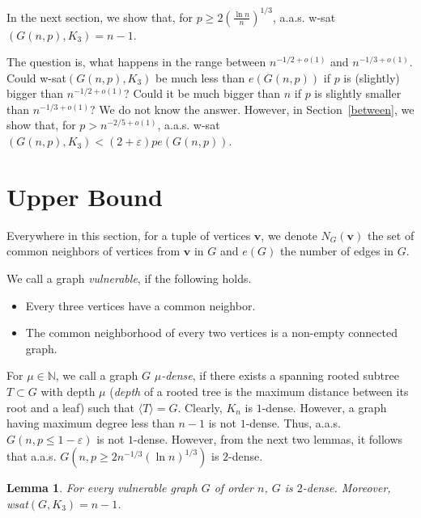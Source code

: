\documentclass[]{article}
\newtheorem{lemma}[theorem]{Lemma}
\begin{document}
In the next section, we show that, for $p\geq 2\left(\frac{\ln n}{n}\right)^{1/3}$, a.a.s. w-sat$(G(n,p),K_3)=n-1$. 

The question is, what happens in the range between $n^{-1/2+o(1)}$ and $n^{-1/3+o(1)}$. Could w-sat$(G(n,p),K_3)$ be much less than $e(G(n,p))$ if $p$ is (slightly) bigger than $n^{-1/2+o(1)}$? Could it be much bigger than $n$ if $p$ is slightly smaller than $n^{-1/3+o(1)}$? We do not know the answer. However, in Section~\ref{between}, we show that, for $p>n^{-2/5+o(1)}$, a.a.s. w-sat$(G(n,p),K_3)<(2+\varepsilon)p e(G(n,p))$.


 
 
 \section{Upper Bound}
 \label{upper}
 
 Everywhere in this section, for a tuple of vertices $\mathbf{v}$, we denote $N_G(\mathbf{v})$ the set of common neighbors of vertices from $\mathbf{v}$ in $G$ and $e(G)$ the number of edges in $G$.
 
 We call a graph {\it vulnerable}, if the following holds.
 
\begin{itemize}
	\item  Every three vertices have a common neighbor.
	\item The common neighborhood of every two vertices is a non-empty connected graph.
\end{itemize} 

For $\mu\in\mathbb{N}$, we call a graph $G$ {\it $\mu$-dense}, if there exists a spanning rooted subtree $T\subset G$ with depth $\mu$ ({\it depth} of a rooted tree is the maximum distance between its root and a leaf) such that $\langle T\rangle=G$.
Clearly, $K_n$ is $1$-dense. However, a graph having maximum degree less than $n-1$ is not $1$-dense. %
Thus, a.a.s. $G(n,p\leq 1-\varepsilon)$ is not $1$-dense. However, from the next two lemmas, it follows that a.a.s. $G(n,p\geq 2n^{-1/3} (\ln n)^{1/3})$ is $2$-dense.

\begin{lemma}
	For every vulnerable graph $G$ of order $n$, $G$ is $2$-dense. Moreover, wsat$(G,K_3)=n-1$.
\label{lem_upper}
\end{lemma}
\end{document}
